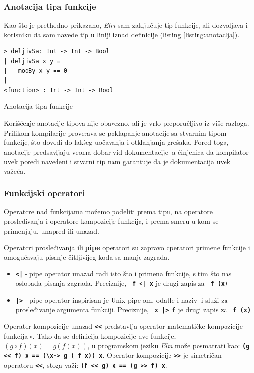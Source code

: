 \documentclass[12pt,oneside]{memoir}
\begin{document}
\subsubsection{Anotacija tipa funkcije}
Kao što je prethodno prikazano, \emph{Elm} sam zaključuje tip funkcije, ali dozvoljava i korisniku
da sam navede tip u liniji iznad definicije (listing \ref{listing:anotacija}).
\begin{listing}[!h]
\begin{verbatim}
> deljivSa: Int -> Int -> Bool
| deljivSa x y =
|   modBy x y == 0
|
<function> : Int -> Int -> Bool
\end{verbatim}
\caption{Anotacija tipa funkcije}
\label{listing:anotacija}
\end{listing}

Korišćenje anotacije tipova nije obavezno, ali je vrlo preporučljivo iz više razloga.
Prilikom kompilacije proverava se poklapanje anotacije sa stvarnim tipom funkcije, što
dovodi do lakšeg uočavanja i otklanjanja grešaka. Pored toga, anotacije predsavljaju veoma
dobar vid dokumentacije, a činjenica da kompilator uvek poredi navedeni i stvarni tip nam
garantuje da je dokumentacija uvek važeća.

\subsubsection{Funkcijski operatori}
Operatore nad funkcijama možemo podeliti prema tipu, na operatore prosleđivanja i operatore
kompozicije funkcija, i prema smeru u kom se primenjuju, unapred ili unazad.

Operatori prosleđivanja ili \textbf{pipe} operatori su zapravo operatori primene funkcije
i omogućavaju pisanje čitljivijeg koda sa manje zagrada.
\begin{itemize}
  \item \texttt{\textbf{<|}} - pipe operator unazad radi isto što i primena funkcije, 
  s tim što nas oslobađa pisanja zagrada. Preciznije, \texttt{\textbf{ f <| x}} je drugi zapis
  za \texttt{\textbf{ f (x)}}
  \item \texttt{\textbf{|>}} - pipe operator inspirisan je Unix pipe-om, odatle i
  naziv, i služi za prosleđivanje argumenta funkciji. Preciznije,  \texttt{\textbf{ x |> f}}
  je drugi zapis za \texttt{\textbf{ f (x)}}
\end{itemize}

Operator kompozicije unazad \texttt{\textbf{<\smallskip<}} predstavlja operator matematičke 
kompozicije funkcija \(\circ\). Tako da se definicija kompozicije dve funkcije, \((g \circ f)(x) = g(f(x))\),
u programskom jeziku \emph{Elm} može posmatrati kao: \texttt{\textbf{(g <\smallskip< f) x == (\textbackslash x\textunderscore ->
g ( f x\textunderscore)) x}}. Operator kompozicije \texttt{\textbf{>\smallskip>}} je
simetričan operatoru \texttt{\textbf{<\smallskip<}}, stoga važi: \texttt{\textbf{(f <\smallskip< g) x == (g >\smallskip> f) x}}.
\end{document}
